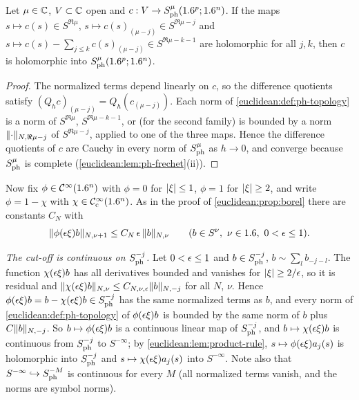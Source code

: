 \begin{lemma}\label{soleuclidean:lem:ph-hol-criterion}
  Let $\mu\in\mathbb{C}$, $V\subset\mathbb{C}$ open and $c:V\to S^{\mu}_{\mathrm{ph}}(1.6^p;1.6^n)$. If the maps
  $s\mapsto c(s)\in S^{\Re\mu}$, $s\mapsto c(s)_{(\mu-j)}\in S^{\Re\mu-j}$ and
  $s\mapsto c(s)-\sum_{j\le k}c(s)_{(\mu-j)}\in S^{\Re\mu-k-1}$ are holomorphic for all
  $j,k$, then $c$ is holomorphic into $S^{\mu}_{\mathrm{ph}}(1.6^p;1.6^n)$.
\end{lemma}
\begin{proof}
  The normalized terms depend linearly on $c$, so the difference quotients satisfy
  $(Q_hc)_{(\mu-j)}=Q_h(c_{(\mu-j)})$. Each norm of \cref{euclidean:def:ph-topology} is a
  norm of $S^{\Re\mu}$, $S^{\Re\mu-k-1}$, or (for the second family) is bounded by a norm
  $\lVert \cdot\rVert_{N,\Re\mu-j}$ of $S^{\Re\mu-j}$, applied to one of the three maps. Hence the
  difference quotients of $c$ are Cauchy in every norm of $S^{\mu}_{\mathrm{ph}}$ as $h\to0$, and
  converge because $S^{\mu}_{\mathrm{ph}}$ is complete (\cref{euclidean:lem:ph-frechet}(ii)).
\end{proof}

Now fix $\phi\in\mathcal{C}^\infty(1.6^n)$ with $\phi=0$ for $\lvert \xi\rvert\le1$, $\phi=1$ for $\lvert \xi\rvert\ge2$,
and write $\phi=1-\chi$ with $\chi\in\mathcal{C}^\infty_{\mathrm{c}}(1.6^n)$. As in the proof of
\cref{euclidean:prop:borel} there are constants $C_N$ with
\begin{equation}\label{soleuclidean:eq:borel-gain}
  \lVert \phi(\epsilon\xi)b\rVert_{N,\nu+1}\le C_N\,\epsilon\,\lVert b\rVert_{N,\nu}\qquad
  (b\in S^\nu,\ \nu\in1.6,\ 0<\epsilon\le1).
\end{equation}

\emph{The cut-off is continuous on $S^{-j}_{\mathrm{ph}}$.} Let $0<\epsilon\le1$ and
$b\in S^{-j}_{\mathrm{ph}}$, $b\sim\sum_lb_{-j-l}$. The function $\chi(\epsilon\xi)b$ has all derivatives
bounded and vanishes for $\lvert \xi\rvert\ge2/\epsilon$, so it is residual and
$\lVert \chi(\epsilon\xi)b\rVert_{N,\nu}\le C_{N,\nu,\epsilon}\lVert b\rVert_{N,-j}$ for all $N$, $\nu$. Hence
$\phi(\epsilon\xi)b=b-\chi(\epsilon\xi)b\in S^{-j}_{\mathrm{ph}}$ has the same normalized terms as $b$, and
every norm of \cref{euclidean:def:ph-topology} of $\phi(\epsilon\xi)b$ is bounded by the same
norm of $b$ plus $C\lVert b\rVert_{N,-j}$. So $b\mapsto\phi(\epsilon\xi)b$ is a continuous linear map
of $S^{-j}_{\mathrm{ph}}$, and $b\mapsto\chi(\epsilon\xi)b$ is continuous from $S^{-j}_{\mathrm{ph}}$ to
$S^{-\infty}$; by \cref{euclidean:lem:product-rule}, $s\mapsto\phi(\epsilon\xi)a_j(s)$ is
holomorphic into $S^{-j}_{\mathrm{ph}}$ and $s\mapsto\chi(\epsilon\xi)a_j(s)$ into $S^{-\infty}$. Note
also that $S^{-\infty}\hookrightarrow S^{-M}_{\mathrm{ph}}$ is continuous for every $M$ (all normalized
terms vanish, and the norms are symbol norms).


